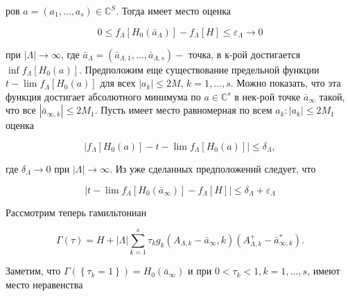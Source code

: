 \documentclass[10pt]{article}
\begin{document}
ров $a=\left(a_{1}, \ldots, a_{s}\right) \in \mathbb{C}^{S}$. Тогда имеет место оценка



\[

0 \leqslant f_{\Lambda}\left[H_{0}\left(\bar{a}_{\Lambda}\right)\right]-f_{\Lambda}[H] \leqslant \varepsilon_{\Lambda} \rightarrow 0

\]



при $|\Lambda| \rightarrow \infty$, где $\bar{a}_{\Lambda}=\left(\bar{a}_{\Lambda, 1}, \ldots, \bar{a}_{\Lambda, s}\right)-$ точка, в к-рой достигается $\inf f_{\Lambda}\left[H_{0}(a)\right]$. Предположим еще существование предельной функции $t-\lim f_{\Lambda}\left[H_{0}(a)\right]$ для всех $\left|a_{k}\right| \leqslant 2 M$, $k=1, \ldots, s$. Можно показать, что эта функция достигает абсолютного минимума по $a \in \mathbb{C}^{s}$ в нек-рой точке $\bar{a}_{\infty}$ такой, что все $\left|\bar{a}_{\infty, k}\right| \leqslant 2 M_{1}$. Пусть имеет место равномерная по всем $a_{k}:\left|a_{k}\right| \leqslant 2 M_{1}$ оценка



\[

\left|f_{\Lambda}\left[H_{0}(a)\right]-t-\lim f_{\Lambda}\left[H_{0}(a)\right]\right| \leqslant \delta_{\Lambda},

\]



где $\delta_{\Lambda} \rightarrow 0$ при $|\Lambda| \rightarrow \infty$. Из уже сделанных предположений следует, что



\[

\left|t-\lim f_{\Lambda}\left[H_{0}\left(\bar{a}_{\infty}\right)\right]-f_{\Lambda}[H]\right| \leqslant \delta_{\Lambda}+\varepsilon_{\Lambda}

\]



Рассмотрим теперь гамильтониан



\[

\Gamma(\tau)=H+|\Lambda| \sum_{k=1}^{s} \tau_{k} g_{k}\left(A_{\Lambda, k}-\bar{a}_{\infty}, k\right)\left(A_{\Lambda, k}^{+}-\bar{a}_{\infty, k}^{*}\right) .

\]



Заметим, что $\Gamma\left(\left\{\tau_{k}=1\right\}\right)=H_{0}\left(\bar{a}_{\infty}\right)$ и при $0<\tau_{k}<1, k=1, \ldots, s$, имеют место неравенства
\end{document}

